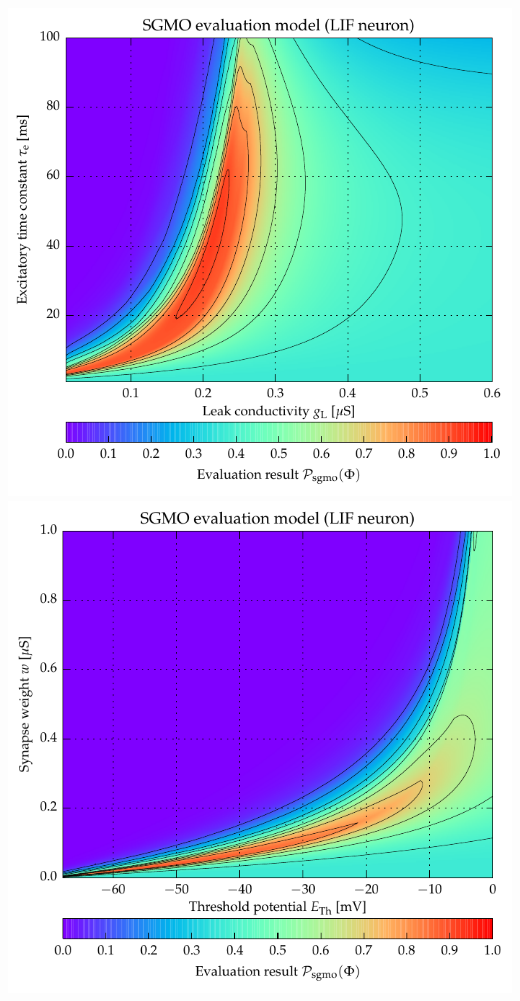 {\newpage
\vspace*{1.5cm}
\includegraphics[trim=0cm 1.75cm 0cm 0cm,clip]{media/appC/i5_ex_sc1_SgMo_XgL_YtauE_pSoft_SgMo_IfCondExp.pdf}\\
\vspace{0.5cm}
\includegraphics[trim=0cm 0cm 0cm 0.1cm,clip]{media/appC/i15_ex_sc1_SgMo_XeTh_Yw_pSoft_SgMo_IfCondExp.pdf}

}
